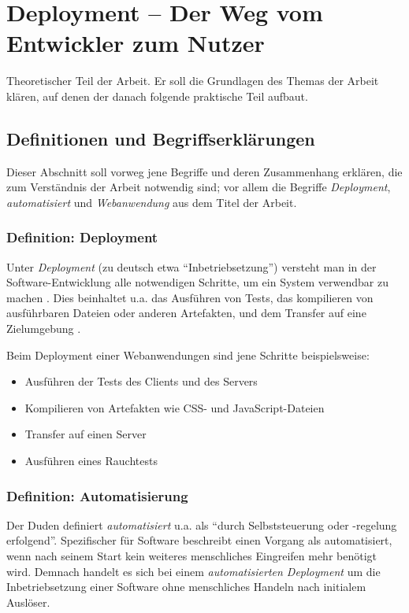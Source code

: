 \chapter{Deployment – Der Weg vom Entwickler zum Nutzer}

{\draft
Theoretischer Teil der Arbeit. Er soll die Grundlagen des Themas der Arbeit klären, auf denen der danach folgende praktische Teil aufbaut.
}

\section{Definitionen und Begriffserklärungen}

Dieser Abschnitt soll vorweg jene Begriffe und deren Zusammenhang erklären, die zum Verständnis der Arbeit notwendig sind; vor allem die Begriffe \emph{Deployment}, \emph{automatisiert} und \emph{Webanwendung} aus dem Titel der Arbeit.

\subsection{Definition: Deployment}

Unter \emph{Deployment} (zu deutsch etwa ``Inbetriebsetzung'') versteht man in der Software-Entwicklung alle notwendigen Schritte, um ein System verwendbar zu machen \citep[21]{Breuer2009}. Dies beinhaltet u.a. das Ausführen von Tests, das kompilieren von ausführbaren Dateien oder anderen Artefakten, und dem Transfer auf eine Zielumgebung \citep[4]{Humble2010}.

Beim Deployment einer Webanwendungen sind jene Schritte beispielsweise:

\begin{itemize}
  \item Ausführen der Tests des Clients und des Servers
  \item Kompilieren von Artefakten wie CSS- und JavaScript-Dateien
  \item Transfer auf einen Server
  \item Ausführen eines Rauchtests
\end{itemize}

\subsection{Definition: Automatisierung}

Der Duden \citeyearpar{Duden} definiert \emph{automatisiert} u.a. als ``durch Selbststeuerung oder -regelung erfolgend''. Spezifischer für Software beschreibt \citet[27]{Duvall2007} einen Vorgang als automatisiert, wenn nach seinem Start kein weiteres menschliches Eingreifen mehr benötigt wird. Demnach handelt es sich bei einem \emph{automatisierten Deployment} um die Inbetriebsetzung einer Software ohne menschliches Handeln nach initialem Auslöser.

